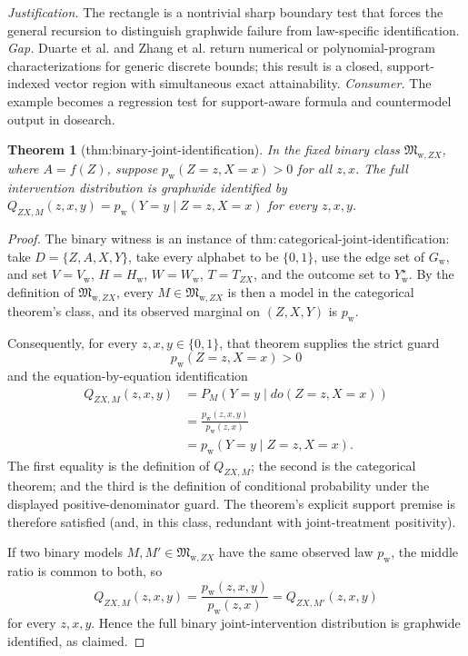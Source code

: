 \documentclass{article}
\newtheorem{theorem}{Theorem}
\begin{document}
\par\smallskip\noindent \textit{Justification.} The rectangle is a nontrivial sharp boundary test that forces the general recursion to distinguish graphwide failure from law-specific identification. \textit{Gap.} Duarte et al. and Zhang et al. return numerical or polynomial-program characterizations for generic discrete bounds; this result is a closed, support-indexed vector region with simultaneous exact attainability. \textit{Consumer.} The example becomes a regression test for support-aware formula and countermodel output in dosearch.

\begin{theorem}[thm:binary-joint-identification]\label{thm:binary-joint-identification}
In the fixed binary class \(\mathfrak M_{\mathrm w,ZX}\), where \(A=f(Z)\), suppose \(p_{\mathrm w}(Z=z,X=x)>0\) for all \(z,x\). The full intervention distribution is graphwide identified by \(Q_{ZX,M}(z,x,y)=p_{\mathrm w}(Y=y\mid Z=z,X=x)\) for every \(z,x,y\).
\end{theorem}
\begin{proof}
The binary witness is an instance of \(\mathrm{thm:categorical\text{-}joint\text{-}identification}\): take \(D=\{Z,A,X,Y\}\), take every alphabet to be \(\{0,1\}\), use the edge set of \(G_{\mathrm w}\), and set \(V=V_{\mathrm w}\), \(H=H_{\mathrm w}\), \(W=W_{\mathrm w}\), \(T=T_{ZX}\), and the outcome set to \(Y_{\mathrm w}^{\star}\).  By the definition of \(\mathfrak M_{\mathrm w,ZX}\), every \(M\in\mathfrak M_{\mathrm w,ZX}\) is then a model in the categorical theorem's class, and its observed marginal on \((Z,X,Y)\) is \(p_{\mathrm w}\).

Consequently, for every \(z,x,y\in\{0,1\}\), that theorem supplies the strict guard
\[
 p_{\mathrm w}(Z=z,X=x)>0
\]
and the equation-by-equation identification
\[
\begin{aligned}
 Q_{ZX,M}(z,x,y)
 &=P_M(Y=y\mid do(Z=z,X=x))\\
 &=\frac{p_{\mathrm w}(z,x,y)}{p_{\mathrm w}(z,x)}\\
 &=p_{\mathrm w}(Y=y\mid Z=z,X=x).
\end{aligned}
\]
The first equality is the definition of \(Q_{ZX,M}\); the second is the categorical theorem; and the third is the definition of conditional probability under the displayed positive-denominator guard.  The theorem's explicit support premise is therefore satisfied (and, in this class, redundant with joint-treatment positivity).

If two binary models \(M,M'\in\mathfrak M_{\mathrm w,ZX}\) have the same observed law \(p_{\mathrm w}\), the middle ratio is common to both, so
\[
 Q_{ZX,M}(z,x,y)
 =\frac{p_{\mathrm w}(z,x,y)}{p_{\mathrm w}(z,x)}
 =Q_{ZX,M'}(z,x,y)
\]
for every \(z,x,y\).  Hence the full binary joint-intervention distribution is graphwide identified, as claimed.
\end{proof}
\end{document}
